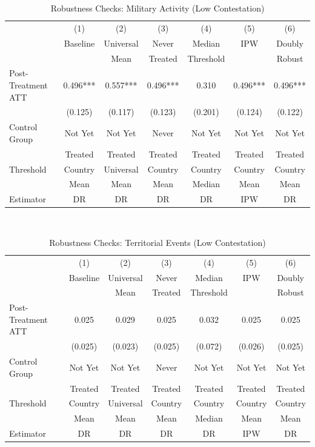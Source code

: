 \documentclass[bibtex]{article}
\begin{document}
{\begin{table}[H]
\centering
\caption{Robustness Checks:  Military Activity  (Low  Contestation)}
\label{tab:robust_ mil _ low }
\begin{tabular}{lcccccc}
\toprule
 & (1) & (2) & (3) & (4) & (5) & (6) \\
 & Baseline & Universal & Never & Median & IPW & Doubly \\
 &  & Mean & Treated & Threshold &  & Robust \\
\midrule
Post-Treatment ATT &  0.496***  &  0.557***  &  0.496***  &  0.310  &  0.496***  &  0.496***  \\
 &  (0.125)  &  (0.117)  &  (0.123)  &  (0.201)  &  (0.124)  &  (0.122)  \\
\midrule
Control Group & Not Yet & Not Yet & Never & Not Yet & Not Yet & Not Yet \\
 & Treated & Treated & Treated & Treated & Treated & Treated \\
Threshold & Country & Universal & Country & Country & Country & Country \\
 & Mean & Mean & Mean & Median & Mean & Mean \\
Estimator & DR & DR & DR & DR & IPW & DR \\
\bottomrule
\end{tabular}\\
\end{table}


\begin{table}[H]
\centering
\caption{Robustness Checks:  Territorial Events  (Low  Contestation)}
\label{tab:robust_ terr _ low }
\begin{tabular}{lcccccc}
\toprule
 & (1) & (2) & (3) & (4) & (5) & (6) \\
 & Baseline & Universal & Never & Median & IPW & Doubly \\
 &  & Mean & Treated & Threshold &  & Robust \\
\midrule
Post-Treatment ATT &  0.025  &  0.029  &  0.025  &  0.032  &  0.025  &  0.025  \\
 &  (0.025)  &  (0.023)  &  (0.025)  &  (0.072)  &  (0.026)  &  (0.025)  \\
\midrule
Control Group & Not Yet & Not Yet & Never & Not Yet & Not Yet & Not Yet \\
 & Treated & Treated & Treated & Treated & Treated & Treated \\
Threshold & Country & Universal & Country & Country & Country & Country \\
 & Mean & Mean & Mean & Median & Mean & Mean \\
Estimator & DR & DR & DR & DR & IPW & DR \\
\bottomrule
\end{tabular}\\
\end{table}


}
\end{document}
